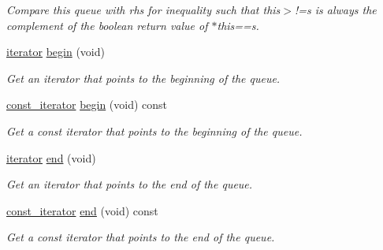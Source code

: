 \begin{DoxyCompactItemize}
\begin{DoxyCompactList}\small\item\em Compare this queue with {\itshape rhs\/} for inequality such that {\itshape this$>$!=s\/} is always the complement of the boolean return value of {\itshape $\ast$this==s\/}. \item\end{DoxyCompactList}\item 
\hyperlink{classMadara_1_1Utility_1_1LQueue__Iterator}{iterator} \hyperlink{classMadara_1_1Utility_1_1LQueue_a5654643d0ee0198e2f36bac1edc0fdc7}{begin} (void)
\begin{DoxyCompactList}\small\item\em Get an iterator that points to the beginning of the queue. \item\end{DoxyCompactList}\item 
\hyperlink{classMadara_1_1Utility_1_1LQueue__Const__Iterator}{const\_\-iterator} \hyperlink{classMadara_1_1Utility_1_1LQueue_ac165a2dd0db172f659744141d769d435}{begin} (void) const 
\begin{DoxyCompactList}\small\item\em Get a const iterator that points to the beginning of the queue. \item\end{DoxyCompactList}\item 
\hyperlink{classMadara_1_1Utility_1_1LQueue__Iterator}{iterator} \hyperlink{classMadara_1_1Utility_1_1LQueue_a8c40c0dd8f0987160ae51c710714eb1e}{end} (void)
\begin{DoxyCompactList}\small\item\em Get an iterator that points to the end of the queue. \item\end{DoxyCompactList}\item 
\hyperlink{classMadara_1_1Utility_1_1LQueue__Const__Iterator}{const\_\-iterator} \hyperlink{classMadara_1_1Utility_1_1LQueue_a4ac54c75ef4373a47715b4c8d965265f}{end} (void) const 
\begin{DoxyCompactList}\small\item\em Get a const iterator that points to the end of the queue. \item\end{DoxyCompactList}\end{DoxyCompactItemize}
